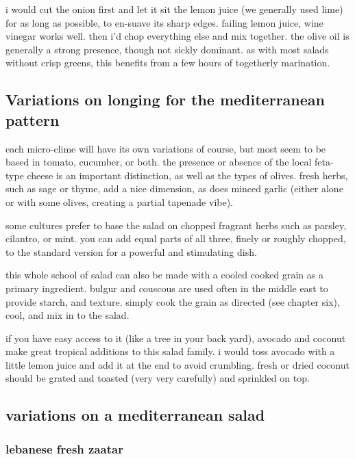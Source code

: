 i would cut the onion first and let it sit the lemon juice (we generally used 
lime) for as long as possible, to en-suave its sharp edges. failing lemon 
juice, wine vinegar works well. then i'd chop everything else and mix together. 
the olive oil is generally a strong presence, though not sickly dominant. as 
with most salads without crisp greens, this benefits from a few hours of 
togetherly marination.

\subsection{Variations on longing for the mediterranean pattern}

each micro-clime will have its own variations of course, but most seem to be 
based in tomato, cucumber, or both. the presence or absence of the local 
feta-type cheese is an important distinction, as well as the types of olives. 
fresh herbs, such as sage or thyme, add a nice dimension, as does minced garlic 
(either alone or with some olives, creating a partial \gls{tapenade} vibe).

some cultures prefer to base the salad on chopped fragrant herbs such as 
parsley, cilantro, or mint. you can add equal parts of all three, finely or 
roughly chopped, to the standard version for a powerful and stimulating dish.

this whole school of salad can also be made with a cooled cooked grain as a 
primary ingredient. bulgur and couscous are used often in the middle east to 
provide starch, and texture. simply cook the grain as directed (see chapter 
six), cool, and mix in to the salad.

if you have easy access to it (like a tree in your back yard), avocado and 
coconut make great tropical additions to this salad family. i would toss 
avocado with a little lemon juice and add it at the end to avoid crumbling. 
fresh or dried coconut should be grated and toasted (very very carefully) and 
sprinkled on top.

\subsection{variations on a mediterranean salad}

\subsubsection{lebanese fresh \gls{zaatar}}

